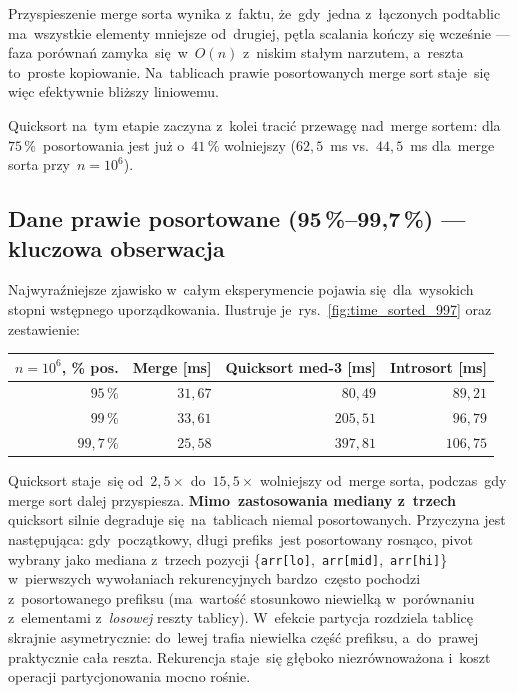 \documentclass[11pt,a4paper]{article}
\begin{document}
Przyspieszenie merge sorta wynika z~faktu, że~gdy~jedna z~łączonych podtablic ma~wszystkie elementy
mniejsze od~drugiej, pętla scalania kończy się wcześnie --- faza porównań zamyka~się~w~$O(n)$
z~niskim stałym narzutem, a~reszta to~proste kopiowanie. Na~tablicach prawie posortowanych merge
sort staje~się więc efektywnie bliższy liniowemu.

Quicksort na~tym etapie zaczyna z~kolei tracić przewagę nad~merge sortem: dla~$75\,\%$~posortowania
jest już o~$41\,\%$ wolniejszy ($62{,}5$~ms vs.~$44{,}5$~ms dla~merge sorta przy~$n=10^6$).

\subsection{Dane prawie posortowane (95\,\%--99,7\,\%) --- kluczowa obserwacja}

Najwyraźniejsze zjawisko w~całym eksperymencie pojawia się~dla~wysokich stopni wstępnego
uporządkowania. Ilustruje je~rys.~\ref{fig:time_sorted_997} oraz zestawienie:
\begin{center}
\begin{tabular}{rrrr}
\toprule
$n=10^6$, \% pos. & Merge [ms] & Quicksort med-3 [ms] & Introsort [ms] \\
\midrule
$95\,\%$    & $31{,}67$  & $80{,}49$   & $89{,}21$  \\
$99\,\%$    & $33{,}61$  & $205{,}51$  & $96{,}79$  \\
$99{,}7\,\%$& $25{,}58$  & $397{,}81$  & $106{,}75$ \\
\bottomrule
\end{tabular}
\end{center}

Quicksort staje~się od~$2{,}5\times$ do~$15{,}5\times$ wolniejszy od~merge sorta, podczas~gdy
merge sort dalej przyspiesza. \textbf{Mimo~zastosowania mediany z~trzech} quicksort silnie
degraduje się~na~tablicach niemal posortowanych. Przyczyna jest następująca: gdy~początkowy,
długi prefiks~jest posortowany rosnąco, pivot wybrany jako mediana z~trzech pozycji
\{\texttt{arr[lo]},~\texttt{arr[mid]},~\texttt{arr[hi]}\} w~pierwszych wywołaniach rekurencyjnych
bardzo~często pochodzi z~posortowanego prefiksu (ma~wartość stosunkowo niewielką
w~porównaniu z~elementami z~\emph{losowej} reszty tablicy). W~efekcie partycja rozdziela tablicę
skrajnie asymetrycznie: do~lewej trafia niewielka część prefiksu, a~do~prawej praktycznie cała
reszta. Rekurencja staje~się głęboko niezrównoważona i~koszt operacji partycjonowania mocno rośnie.
\end{document}
